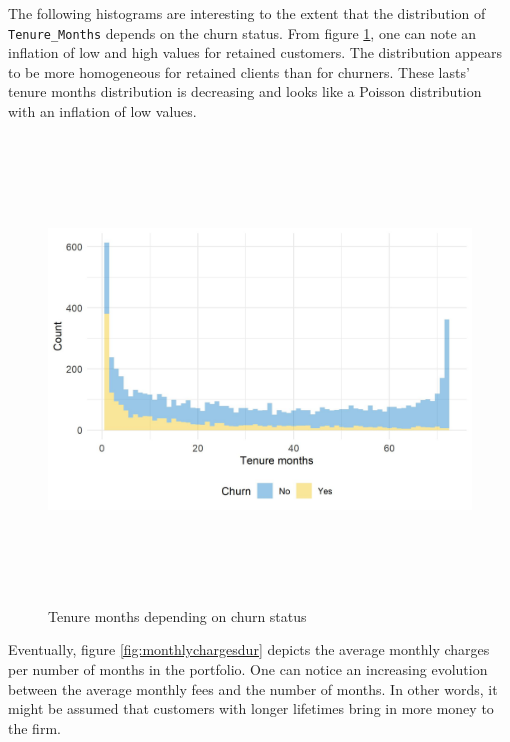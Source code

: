 \documentclass[
]{book}
\begin{document}
The following histograms are interesting to the extent that the distribution of \texttt{Tenure\_Months} depends on the churn status. From figure \ref{fig:churndur}, one can note an inflation of low and high values for retained customers. The distribution appears to be more homogeneous for retained clients than for churners. These lasts' tenure months distribution is decreasing and looks like a Poisson distribution with an inflation of low values.

\begin{figure}

{\centering \includegraphics[width=500pt,height=350pt]{./imgs/duration_churn_plot} 

}

\caption{Tenure months depending on churn status}\label{fig:churndur}
\end{figure}

Eventually, figure \ref{fig:monthlychargesdur} depicts the average monthly charges per number of months in the portfolio. One can notice an increasing evolution between the average monthly fees and the number of months. In other words, it might be assumed that customers with longer lifetimes bring in more money to the firm.
\end{document}
